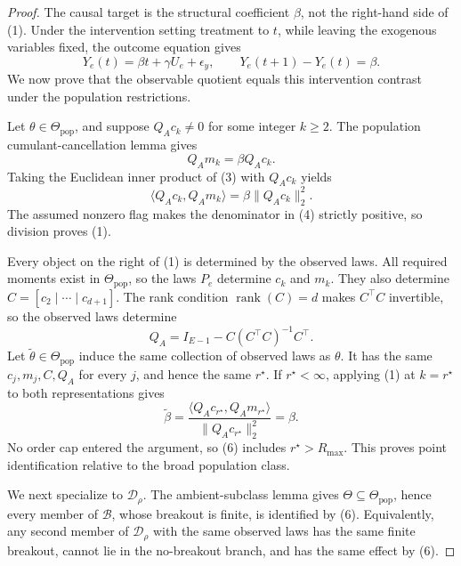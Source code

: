 \documentclass{article}
\begin{document}
\begin{proof}
The causal target is the structural coefficient \(\beta\), not the right-hand side of (1).  Under the intervention setting treatment to \(t\), while leaving the exogenous variables fixed, the outcome equation gives
\[
 Y_e(t)=\beta t+\gamma U_e+\epsilon_y,
 \qquad Y_e(t+1)-Y_e(t)=\beta.                                             \tag{2}
\]
We now prove that the observable quotient equals this intervention contrast under the population restrictions.

Let \(\theta\in\Theta_{\mathrm{pop}}\), and suppose \(Q_Ac_k\neq0\) for some integer \(k\geq2\).  The population cumulant-cancellation lemma gives
\[
 Q_Am_k=\beta Q_Ac_k.                                                       \tag{3}
\]
Taking the Euclidean inner product of (3) with \(Q_Ac_k\) yields
\[
 \langle Q_Ac_k,Q_Am_k\rangle
 =\beta\lVert Q_Ac_k\rVert_2^2.                                          \tag{4}
\]
The assumed nonzero flag makes the denominator in (4) strictly positive, so division proves (1).

Every object on the right of (1) is determined by the observed laws.  All required moments exist in \(\Theta_{\mathrm{pop}}\), so the laws \(P_e\) determine \(c_k\) and \(m_k\).  They also determine \(C=[c_2\mid\cdots\mid c_{d+1}]\).  The rank condition \(\operatorname{rank}(C)=d\) makes \(C^\top C\) invertible, so the observed laws determine
\[
 Q_A=I_{E-1}-C(C^\top C)^{-1}C^\top.                                    \tag{5}
\]
Let \(\widetilde\theta\in\Theta_{\mathrm{pop}}\) induce the same collection of observed laws as \(\theta\).  It has the same \(c_j,m_j,C,Q_A\) for every \(j\), and hence the same \(r^\star\).  If \(r^\star<\infty\), applying (1) at \(k=r^\star\) to both representations gives
\[
 \widetilde\beta
 =\frac{\langle Q_Ac_{r^\star},Q_Am_{r^\star}\rangle}
        {\lVert Q_Ac_{r^\star}\rVert_2^2}
 =\beta.                                                                   \tag{6}
\]
No order cap entered the argument, so (6) includes \(r^\star>R_{\max}\).  This proves point identification relative to the broad population class.

We next specialize to \(\mathcal D_\rho\).  The ambient-subclass lemma gives \(\Theta\subseteq\Theta_{\mathrm{pop}}\), hence every member of \(\mathcal B\), whose breakout is finite, is identified by (6).  Equivalently, any second member of \(\mathcal D_\rho\) with the same observed laws has the same finite breakout, cannot lie in the no-breakout branch, and has the same effect by (6).


\end{proof}
\end{document}
